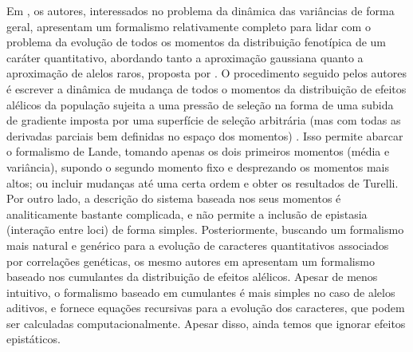 Em \cite{Barton1987}, os autores, interessados no problema da dinâmica
das variâncias de forma geral, apresentam um formalismo relativamente
completo para lidar com o problema da evolução de todos os momentos da
distribuição fenotípica de um caráter quantitativo, abordando tanto a
aproximação gaussiana quanto a aproximação de alelos raros, proposta por
\cite{Turelli1984}.
O procedimento seguido pelos autores é escrever a dinâmica de mudança de
todos o momentos da distribuição de efeitos alélicos da população
sujeita a uma pressão de seleção na forma de uma subida de gradiente
imposta por uma superfície de seleção arbitrária (mas com todas as
derivadas parciais bem definidas no espaço dos momentos)
\citep{Arnold2001a}.
Isso permite abarcar o formalismo de Lande, tomando apenas os dois
primeiros momentos (média e variância), supondo o segundo momento fixo e
desprezando os momentos mais altos; ou incluir mudanças até uma certa
ordem e obter os resultados de Turelli.
Por outro lado, a descrição do sistema baseada nos seus momentos é
analiticamente bastante complicada, e não permite a inclusão de
epistasia (interação entre loci) de forma simples.
Posteriormente, buscando um formalismo mais natural e genérico para a
evolução de caracteres quantitativos associados por correlações
genéticas, os mesmo autores em \cite{Turelli1994} apresentam um
formalismo baseado nos cumulantes da distribuição de efeitos alélicos.
Apesar de menos intuitivo, o formalismo baseado em cumulantes é mais
simples no caso de alelos aditivos, e fornece equações
recursivas para a evolução dos caracteres, que podem ser calculadas
computacionalmente.
Apesar disso, ainda temos que ignorar efeitos epistáticos.

